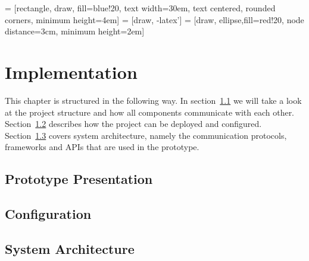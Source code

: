  = [rectangle, draw, fill=blue!20, 
    text width=30em, text centered, rounded corners, minimum height=4em]
 = [draw, -latex']
 = [draw, ellipse,fill=red!20, node distance=3cm,
    minimum height=2em]

\chapter{Implementation}
\label{ch:implementation}
This chapter is structured in the following way.
In section~\ref{sec:prototype-presentation} we will take a look at the project structure and
how all components communicate with each other.
Section~\ref{sec:configuration} describes how the project can be deployed and configured.
Section~\ref{sec:system-architecture} covers system architecture, namely the
communication protocols, frameworks and APIs that are used in the prototype.

\section{Prototype Presentation}
\label{sec:prototype-presentation}

\section{Configuration}
\label{sec:configuration}

\section{System Architecture}
\label{sec:system-architecture}










